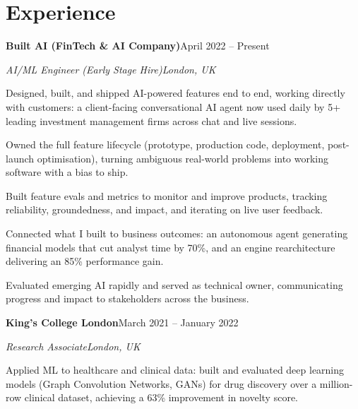 \documentclass[10pt,a4paper]{article}
\newcommand{\entry}[4]{%
  {\color{company}\bfseries #1}\hfill {\color{muted}#2}\par
  \vspace{1pt}
  {\itshape #3}\hfill {\color{muted}\itshape #4}\par
  \vspace{3pt}%
}
\begin{document}
\section{Experience}
\entry{Built AI (FinTech \& AI Company)}{April 2022 -- Present}{AI/ML Engineer (Early Stage Hire)}{London, UK}
\begin{tight}
  \item Designed, built, and shipped AI-powered features end to end, working directly with customers: a client-facing conversational AI agent now used daily by 5+ leading investment management firms across chat and live sessions.
  \item Owned the full feature lifecycle (prototype, production code, deployment, post-launch optimisation), turning ambiguous real-world problems into working software with a bias to ship.
  \item Built feature evals and metrics to monitor and improve products, tracking reliability, groundedness, and impact, and iterating on live user feedback.
  \item Connected what I built to business outcomes: an autonomous agent generating financial models that cut analyst time by 70\%, and an engine rearchitecture delivering an 85\% performance gain.
  \item Evaluated emerging AI rapidly and served as technical owner, communicating progress and impact to stakeholders across the business.
\end{tight}

\entry{King's College London}{March 2021 -- January 2022}{Research Associate}{London, UK}
\begin{tight}
  \item Applied ML to healthcare and clinical data: built and evaluated deep learning models (Graph Convolution Networks, GANs) for drug discovery over a million-row clinical dataset, achieving a 63\% improvement in novelty score.
\end{tight}

\end{document}
